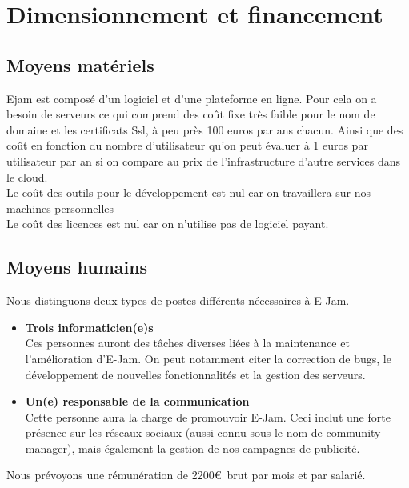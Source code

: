 \documentclass[a4,12pt]{article}
\begin{document}
\section{Dimensionnement et financement}


\subsection{Moyens matériels}

Ejam est composé d'un logiciel et d'une plateforme en ligne.
Pour cela on a besoin de serveurs ce qui comprend des coût fixe très faible pour le nom de domaine et les certificats Ssl, à peu près 100 euros par ans chacun.
Ainsi que des coût en fonction du nombre d'utilisateur qu'on peut évaluer à 1 euros par utilisateur par an si on compare au prix de l'infrastructure d'autre services dans le cloud.\\

Le coût des outils pour le développement est nul car on travaillera sur nos machines personnelles\\

Le coût des licences est nul car on n'utilise pas de logiciel payant.\\

\subsection{Moyens humains}

Nous distinguons deux types de postes différents nécessaires à E-Jam.

\begin{itemize}
    \item \textbf{Trois informaticien(e)s}\\
    Ces personnes auront des tâches diverses liées à la maintenance et l'amélioration d'E-Jam.
    On peut notamment citer la correction de bugs, le développement de nouvelles
    fonctionnalités et la gestion des serveurs.
    \item \textbf{Un(e) responsable de la communication}\\
    Cette personne aura la charge de promouvoir E-Jam. Ceci inclut une forte présence
    sur les réseaux sociaux (aussi connu sous le nom de community manager), mais
    également la gestion de nos campagnes de publicité.
\end{itemize}

Nous prévoyons une rémunération de 2200\euro\ brut par mois et par salarié.
\end{document}
